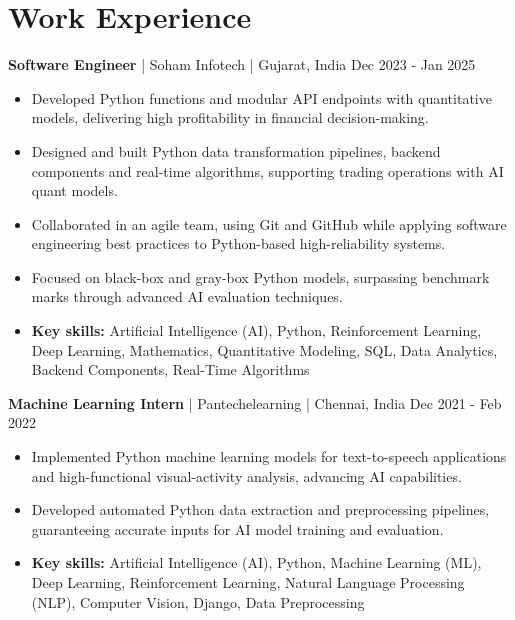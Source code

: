 \documentclass[a4paper,10pt]{article}
\begin{document}
\section*{Work Experience}
\textbf{Software Engineer} | Soham Infotech | Gujarat, India \hfill Dec 2023 - Jan 2025\par
\begin{itemize}
\item Developed Python functions and modular API endpoints with quantitative models, delivering high profitability in financial decision-making.
\item Designed and built Python data transformation pipelines, backend components and real-time algorithms, supporting trading operations with AI quant models.
\item Collaborated in an agile team, using Git and GitHub while applying software engineering best practices to Python-based high-reliability systems.
\item Focused on black-box and gray-box Python models, surpassing benchmark marks through advanced AI evaluation techniques.
\item \textbf{Key skills:} Artificial Intelligence (AI), Python, Reinforcement Learning, Deep Learning, Mathematics, Quantitative Modeling, SQL, Data Analytics, Backend Components, Real-Time Algorithms
\end{itemize}
\vspace{3pt}
\textbf{Machine Learning Intern} | Pantechelearning | Chennai, India \hfill Dec 2021 - Feb 2022\par
\begin{itemize}
\item Implemented Python machine learning models for text-to-speech applications and high-functional visual-activity analysis, advancing AI capabilities.
\item Developed automated Python data extraction and preprocessing pipelines, guaranteeing accurate inputs for AI model training and evaluation.
\item \textbf{Key skills:} Artificial Intelligence (AI), Python, Machine Learning (ML), Deep Learning, Reinforcement Learning, Natural Language Processing (NLP), Computer Vision, Django, Data Preprocessing
\end{itemize}
\vspace{3pt}
\end{document}
